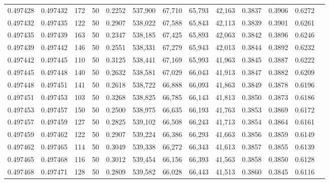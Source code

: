 \begin{tabular}{rrrrrrrrrrrrr}
0.497428 & 0.497432 &   172 &  50 &                                     0.2252 & 537,900 &  67,710 &  65,793 &  42,163 & 0.3837 & 0.3906 & 0.6272 \\
0.497432 & 0.497435 &   122 &  50 &                                     0.2907 & 538,022 &  67,588 &  65,843 &  42,113 & 0.3839 & 0.3901 & 0.6261 \\
0.497435 & 0.497439 &   163 &  50 &                                     0.2347 & 538,185 &  67,425 &  65,893 &  42,063 & 0.3842 & 0.3896 & 0.6246 \\
0.497439 & 0.497442 &   146 &  50 &                                     0.2551 & 538,331 &  67,279 &  65,943 &  42,013 & 0.3844 & 0.3892 & 0.6232 \\
0.497442 & 0.497445 &   110 &  50 &                                     0.3125 & 538,441 &  67,169 &  65,993 &  41,963 & 0.3845 & 0.3887 & 0.6222 \\
0.497445 & 0.497448 &   140 &  50 &                                     0.2632 & 538,581 &  67,029 &  66,043 &  41,913 & 0.3847 & 0.3882 & 0.6209 \\
0.497448 & 0.497451 &   141 &  50 &                                     0.2618 & 538,722 &  66,888 &  66,093 &  41,863 & 0.3849 & 0.3878 & 0.6196 \\
0.497451 & 0.497453 &   103 &  50 &                                     0.3268 & 538,825 &  66,785 &  66,143 &  41,813 & 0.3850 & 0.3873 & 0.6186 \\
0.497453 & 0.497457 &   150 &  50 &                                     0.2500 & 538,975 &  66,635 &  66,193 &  41,763 & 0.3853 & 0.3869 & 0.6172 \\
0.497457 & 0.497459 &   127 &  50 &                                     0.2825 & 539,102 &  66,508 &  66,243 &  41,713 & 0.3854 & 0.3864 & 0.6161 \\
0.497459 & 0.497462 &   122 &  50 &                                     0.2907 & 539,224 &  66,386 &  66,293 &  41,663 & 0.3856 & 0.3859 & 0.6149 \\
0.497462 & 0.497465 &   114 &  50 &                                     0.3049 & 539,338 &  66,272 &  66,343 &  41,613 & 0.3857 & 0.3855 & 0.6139 \\
0.497465 & 0.497468 &   116 &  50 &                                     0.3012 & 539,454 &  66,156 &  66,393 &  41,563 & 0.3858 & 0.3850 & 0.6128 \\
0.497468 & 0.497471 &   128 &  50 &                                     0.2809 & 539,582 &  66,028 &  66,443 &  41,513 & 0.3860 & 0.3845 & 0.6116 \\

\end{tabular}
